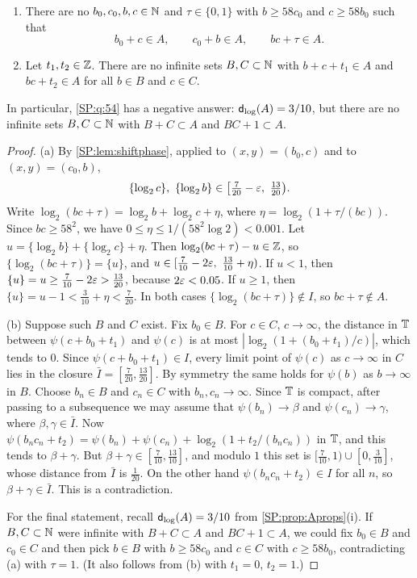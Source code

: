 \begin{theorem}\label{SP:thm:q54}
\leavevmode
\begin{enumerate}[label=\textup{(\alph*)}]
\item There are no $b_0,c_0,b,c\in\mathbb{N}$ and $\tau\in\{0,1\}$ with $b\ge58c_0$ and $c\ge58b_0$
such that
\[
b_0+c\in A,\qquad c_0+b\in A,\qquad bc+\tau\in A .
\]
\item Let $t_1,t_2\in\mathbb{Z}$. There are no infinite sets $B,C\subset\mathbb{N}$ with $b+c+t_1\in A$ and
$bc+t_2\in A$ for all $b\in B$ and $c\in C$.
\end{enumerate}
In particular, \cref{SP:q:54} has a negative answer: $\mathsf{d}_{\log}(A)=3/10$, but there are no infinite
sets $B,C\subset\mathbb{N}$ with $B+C\subset A$ and $BC+1\subset A$.
\end{theorem}

\begin{proof}
(a) By \cref{SP:lem:shiftphase}, applied to $(x,y)=(b_0,c)$ and to $(x,y)=(c_0,b)$,
\[
\{\log_2c\},\ \{\log_2b\}\in\big[\tfrac7{20}-\eps,\ \tfrac{13}{20}\big).
\]
Write $\log_2(bc+\tau)=\log_2b+\log_2c+\eta$, where $\eta=\log_2(1+\tau/(bc))$. Since
$bc\ge58^2$, we have $0\le\eta\le1/(58^2\log2)<0.001$. Let $u=\{\log_2b\}+\{\log_2c\}+\eta$.
Then $\log_2(bc+\tau)-u\in\mathbb{Z}$, so $\{\log_2(bc+\tau)\}=\{u\}$, and
$u\in[\tfrac{7}{10}-2\eps,\ \tfrac{13}{10}+\eta)$.
If $u<1$, then $\{u\}=u\ge\tfrac7{10}-2\varepsilon>\tfrac{13}{20}$, because $2\varepsilon<0.05$.
If $u\ge1$, then $\{u\}=u-1<\tfrac3{10}+\eta<\tfrac7{20}$.
In both cases $\{\log_2(bc+\tau)\}\notin I$, so $bc+\tau\notin A$.

(b) Suppose such $B$ and $C$ exist. Fix $b_0\in B$. For $c\in C$, $c\to\infty$, the distance in
$\mathbb{T}$ between $\psi(c+b_0+t_1)$ and $\psi(c)$ is at most $|\log_2(1+(b_0+t_1)/c)|$, which tends to $0$.
Since $\psi(c+b_0+t_1)\in I$, every limit point of $\psi(c)$ as $c\to\infty$ in $C$ lies in the
closure $\bar I=[\tfrac7{20},\tfrac{13}{20}]$. By symmetry the same holds for $\psi(b)$ as $b\to\infty$ in $B$.
Choose $b_n\in B$ and $c_n\in C$ with $b_n,c_n\to\infty$. Since $\mathbb{T}$ is compact, after passing
to a subsequence we may assume that $\psi(b_n)\to\beta$ and $\psi(c_n)\to\gamma$, where
$\beta,\gamma\in\bar I$. Now
$\psi(b_nc_n+t_2)=\psi(b_n)+\psi(c_n)+\log_2(1+t_2/(b_nc_n))$ in $\mathbb{T}$, and this tends to $\beta+\gamma$. But
$\beta+\gamma\in[\tfrac7{10},\tfrac{13}{10}]$, and modulo $1$ this set is
$[\tfrac7{10},1)\cup[0,\tfrac3{10}]$, whose distance from $\bar I$ is $\tfrac1{20}$. On the other hand
$\psi(b_nc_n+t_2)\in I$ for all $n$, so $\beta+\gamma\in\bar I$. This is a contradiction.

For the final statement, recall $\mathsf{d}_{\log}(A)=3/10$ from \cref{SP:prop:Aprops}(i). If $B,C\subset\mathbb{N}$
were infinite with $B+C\subset A$ and $BC+1\subset A$, we could fix $b_0\in B$ and $c_0\in C$ and
then pick $b\in B$ with $b\ge58c_0$ and $c\in C$ with $c\ge58b_0$, contradicting (a) with
$\tau=1$. (It also follows from (b) with $t_1=0$, $t_2=1$.)
\end{proof}

